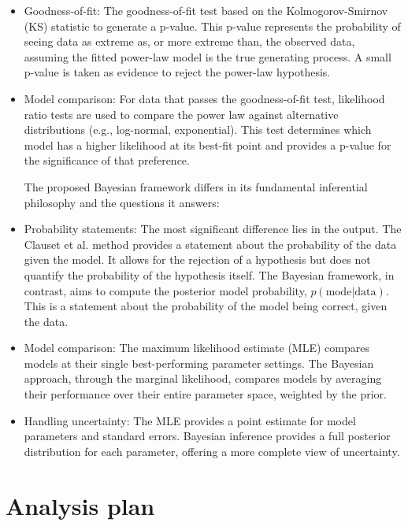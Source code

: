 \documentclass[stu,12pt,floatsintext]{apa7}
\begin{document}
\begin{itemize}

\item Goodness-of-fit: The goodness-of-fit test based on the Kolmogorov-Smirnov (KS) statistic to generate a p-value. This p-value represents the probability of seeing data as extreme as, or more extreme than, the observed data, assuming the fitted power-law model is the true generating process. A small p-value is taken as evidence to reject the power-law hypothesis.

\item Model comparison: For data that passes the goodness-of-fit test, likelihood ratio tests are used to compare the power law against alternative distributions (e.g., log-normal, exponential). This test determines which model has a higher likelihood at its best-fit point and provides a p-value for the significance of that preference.

The proposed Bayesian framework differs in its fundamental inferential philosophy and the questions it answers:

\item Probability statements: The most significant difference lies in the output. The Clauset et al. method provides a statement about the probability of the data given the model. It allows for the rejection of a hypothesis but does not quantify the probability of the hypothesis itself. The Bayesian framework, in contrast, aims to compute the posterior model probability, $p(\text{mode}|\text{data})$. This is a statement about the probability of the model being correct, given the data.

\item Model comparison: The maximum likelihood estimate (MLE) compares models at their single best-performing parameter settings. The Bayesian approach, through the marginal likelihood, compares models by averaging their performance over their entire parameter space, weighted by the prior.

\item Handling uncertainty: The MLE provides a point estimate for model parameters and standard errors. Bayesian inference provides a full posterior distribution for each parameter, offering a more complete view of uncertainty.

\end{itemize}

\section{Analysis plan}
\end{document}
